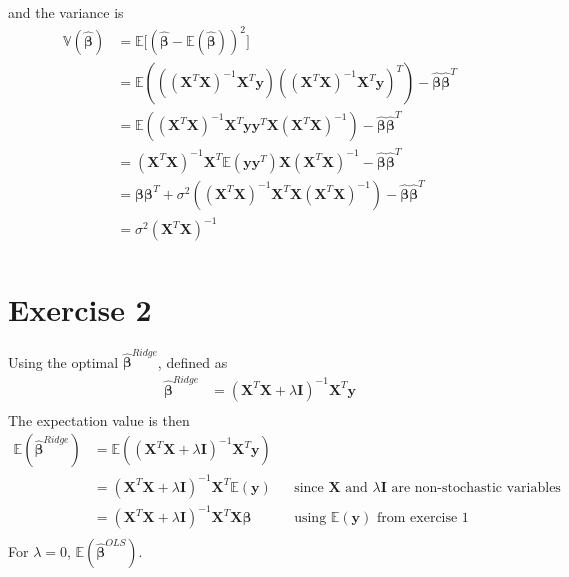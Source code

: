 and the variance is 
\begin{align*}
    \mathbb{V}(\boldsymbol{\hat{\beta}}) &= \mathbb{E} \big[ (\boldsymbol{\hat{\beta}} - \mathbb{E}(\boldsymbol{\hat{\beta}}))^{2} \big] \\
    &= \mathbb{E} (((\boldsymbol{X}^{T} \boldsymbol{X})^{-1} \boldsymbol{X}^{T} \boldsymbol{y}) ((\boldsymbol{X}^{T} \boldsymbol{X})^{-1} \boldsymbol{X}^{T} \boldsymbol{y})^{T}) - \boldsymbol{\hat{\beta}}\boldsymbol{\hat{\beta}}^{T}  \\
    &= \mathbb{E} ((\boldsymbol{X}^{T} \boldsymbol{X})^{-1} \boldsymbol{X}^{T} \boldsymbol{y} \boldsymbol{y}^{T} \boldsymbol{X} (\boldsymbol{X}^{T} \boldsymbol{X})^{-1}) - \boldsymbol{\hat{\beta}}\boldsymbol{\hat{\beta}}^{T}  \\
    &= (\boldsymbol{X}^{T} \boldsymbol{X})^{-1} \boldsymbol{X}^{T} \mathbb{E} (\boldsymbol{y} \boldsymbol{y}^{T}) \boldsymbol{X} (\boldsymbol{X}^{T} \boldsymbol{X})^{-1} - \boldsymbol{\hat{\beta}}\boldsymbol{\hat{\beta}}^{T}  \\
    &= \boldsymbol{\beta} \boldsymbol{\beta}^{T} + \sigma^{2}((\boldsymbol{X}^{T} \boldsymbol{X})^{-1} \boldsymbol{X}^{T} \boldsymbol{X} (\boldsymbol{X}^{T} \boldsymbol{X})^{-1}) - \boldsymbol{\hat{\beta}}\boldsymbol{\hat{\beta}}^{T}  \\
    &= \sigma^{2}(\boldsymbol{X}^{T} \boldsymbol{X})^{-1} \\
\end{align*}


\section{Exercise 2}\label{sec:ex2}
Using the optimal $\mathbf{\hat{\beta}}^{Ridge}$, defined as 
\begin{align*}
    \boldsymbol{\hat{\beta}}^{Ridge} &= (\boldsymbol{X}^{T}\boldsymbol{X} + \lambda \boldsymbol{I})^{-1} \boldsymbol{X}^{T} \boldsymbol{y} \\
\end{align*}
The expectation value is then 
\begin{align*}
    \mathbb{E} (\mathbf{\hat{\beta}}^{Ridge}) &= \mathbb{E}((\mathbf{X}^{T}\mathbf{X} + \lambda \mathbf{I})^{-1} \mathbf{X}^{T} \mathbf{y}) \\
    &= (\mathbf{X}^{T}\mathbf{X} + \lambda \mathbf{I})^{-1} \mathbf{X}^{T} \mathbb{E}( \mathbf{y} ) && \text{since $\mathbf{X}$ and $\lambda \mathbf{I}$ are non-stochastic variables} \\
    &= (\mathbf{X}^{T}\mathbf{X} + \lambda \mathbf{I})^{-1} \mathbf{X}^{T} \mathbf{X} \mathbf{\beta} && \text{using $\mathbb{E} (\mathbf{y})$ from exercise 1} \\
\end{align*}
For $\lambda = 0$, $\mathbb{E} (\mathbf{\hat{\beta}}^{OLS})$. 

